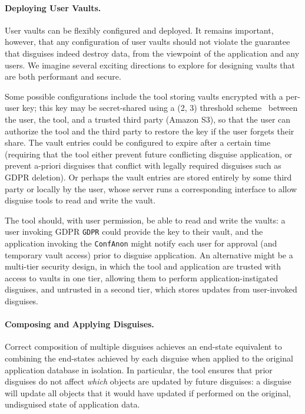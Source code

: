 \paragraph{Deploying User Vaults.}
User vaults can be flexibly configured and deployed. It remains important, however, that any
configuration of user vaults should not violate the guarantee that disguises indeed destroy data,
from the viewpoint of the application and any users.
We imagine several exciting directions to explore for designing vaults that are both
performant and secure.
%

%
Some possible configurations include the tool storing vaults encrypted with a per-user key; this key
may be secret-shared using a (2, 3) threshold scheme~\cite{secretsharing} between the user, the
tool, and a trusted third party (\eg Amazon S3), so that the user can authorize the tool and the
third party to restore the key if the user forgets their share.
%
The vault entries could be configured to expire after a certain time (requiring that the tool either
prevent future conflicting disguise application, or prevent a-priori disguises that conflict with
legally required disguises such as GDPR deletion).
%
Or perhaps the vault entries are stored entirely by some third party or locally by the user, whose
server runs a corresponding interface to allow disguise tools to read and write the vault.

The tool should, with user permission, be able to read and write the vaults: a user invoking GDPR
\texttt{GDPR} could provide the key to their vault, and the application invoking the
\texttt{ConfAnon} might notify each user for approval (and temporary vault access) prior to disguise
application. An alternative might be a multi-tier security design, in which the tool and application
are trusted with access to vaults in one tier, allowing them to perform application-instigated
disguises, and untrusted in a second tier, which stores updates from user-invoked disguises.


\paragraph{Composing and Applying Disguises.}
Correct composition of multiple disguises achieves an end-state equivalent to combining the
end-states achieved by each disguise when applied to the original application database in isolation.
%
In particular, the tool ensures that prior disguises do not affect \emph{which} objects are updated
by future disguises: a disguise will update all objects that it would have updated if performed on
the original, undisguised state of application data.

